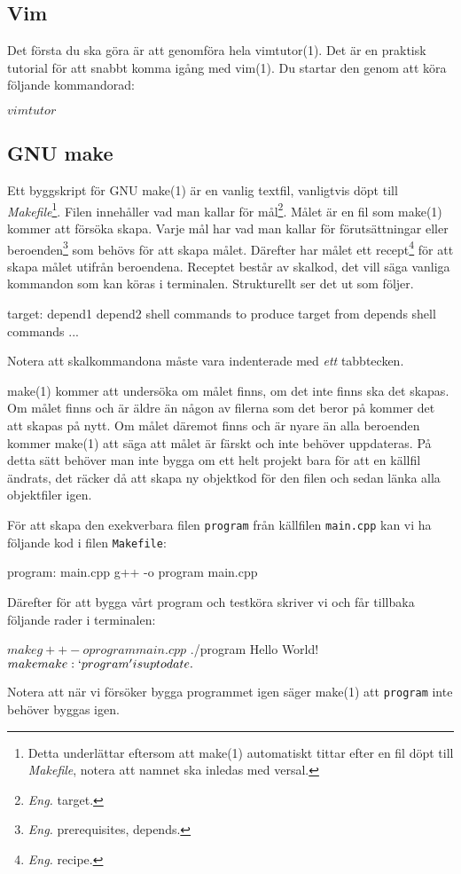 \documentclass[a4paper]{miunasgn}
\begin{document}
\subsection{Vim}
\noindent
Det första du ska göra är att genomföra hela vimtutor(1).
Det är en praktisk tutorial för att snabbt komma igång med vim(1).
Du startar den genom att köra följande kommandorad:
\begin{terminal}
$ vimtutor
$
\end{terminal}

\subsection{GNU make}
\noindent
Ett byggskript för GNU make(1) är en vanlig textfil, vanligtvis döpt till 
\emph{Makefile}\footnote{%
	Detta underlättar eftersom att make(1) automatiskt tittar efter en fil döpt 
	till \emph{Makefile}, notera att namnet ska inledas med versal.
}.
Filen innehåller vad man kallar för mål\footnote{%
	\emph{Eng.} target.
}.
Målet är en fil som make(1) kommer att försöka skapa.
Varje mål har vad man kallar för förutsättningar eller beroenden\footnote{%
	\emph{Eng.} prerequisites, depends.
} som behövs för att skapa målet.
Därefter har målet ett recept\footnote{%
	\emph{Eng.} recipe.
} för att skapa målet utifrån beroendena.
Receptet består av skalkod, det vill säga vanliga kommandon som kan köras 
i terminalen.
Strukturellt ser det ut som följer.
\begin{source}
target: depend1 depend2
	shell commands to produce target from depends
	shell commands ...
\end{source}
Notera att skalkommandona måste vara indenterade med \emph{ett} tabbtecken.

make(1) kommer att undersöka om målet finns, om det inte finns ska det skapas.
Om målet finns och är äldre än någon av filerna som det beror på kommer det att 
skapas på nytt.
Om målet däremot finns och är nyare än alla beroenden kommer make(1) att säga 
att målet är färskt och inte behöver uppdateras.
På detta sätt behöver man inte bygga om ett helt projekt bara för att en 
källfil ändrats, det räcker då att skapa ny objektkod för den filen och sedan 
länka alla objektfiler igen.

För att skapa den exekverbara filen \texttt{program} från källfilen 
\texttt{main.cpp} kan vi ha följande kod i filen \texttt{Makefile}:
\begin{source}
program: main.cpp
	g++ -o program main.cpp
\end{source}
Därefter för att bygga vårt program och testköra skriver vi och får tillbaka 
följande rader i terminalen:
\begin{terminal}
$ make
g++ -o program main.cpp
$ ./program
Hello World!
$ make
make: `program' is up to date.
$
\end{terminal}
Notera att när vi försöker bygga programmet igen säger make(1) att 
\texttt{program} inte behöver byggas igen.
\end{document}
